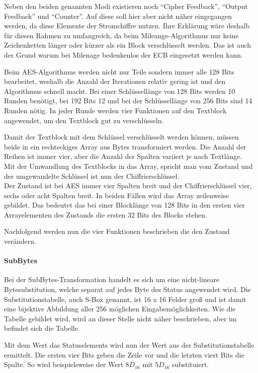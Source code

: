   Neben den beiden genannten Modi existieren noch ``Cipher Feedback'', ``Output Feedback'' und
  ``Counter''. Auf diese soll hier aber nicht näher eingegangen werden, da diese Elemente der
  Stromchiffre nutzen. Ihre Erklärung wäre deshalb für diesen Rahmen zu umfangreich, da beim
  Mileange-Algorithmus nur keine Zeichenketten länger oder kürzer als ein Block verschlüsselt
  werden. Das ist auch der Grund warum bei Milenage bedenkenlos der ECB eingesetzt werden kann.
  
  Beim AES-Algorithmus werden nicht nur Teile sondern immer alle 128 Bits bearbeitet, weshalb die
  Anzahl der Iterationen relativ gering ist und den Algorithmus schnell macht. Bei einer Schlüssellänge
  von 128 Bits werden 10 Runden benötigt, bei 192 Bits 12 und bei der Schlüssellänge von 256 Bits
  sind 14 Runden nötig. In jeder Runde werden vier Funktionen auf den Textblock angewendet, um
  den Textblock gut zu verschlüsseln.
  
  Damit der Textblock mit dem Schlüssel verschlüsselt werden können, müssen beide in ein rechteckiges
  Array aus Bytes transformiert werden. Die Anzahl der Reihen ist immer vier, aber die Anzahl der Spalten
  variiert je nach Textlänge. Mit der Umwandlung des Textblocks in das Array, spricht man vom Zustand
  und der umgewandelte Schlüssel ist nun der Chiffrierschlüssel. \\
  Der Zustand ist bei AES immer vier Spalten breit und der Chiffrierschlüssel vier, sechs oder acht Spalten
  breit. In beiden Fällen wird das Array zeilenweise gebildet. Das bedeutet das bei einer Blocklänge von
  128 Bits in den ersten vier Arrayelementen des Zustands die ersten 32 Bits des Blocks stehen.
  
  Nachfolgend werden nun die vier Funktionen beschrieben die den Zustand verändern.
  
  \paragraph{SubBytes}
   Bei der SubBytes-Transformation handelt es sich um eine nicht-lineare Bytesubstitution, welche
   separat auf jedes Byte des Status angewendet wird. Die Substitutionstabelle, auch S-Box genannt,
   ist 16 x 16 Felder groß und ist damit eine bijektive Abbildung aller 256 möglichen Eingabemöglichkeiten.
   Wie die Tabelle gebildet wird, wird an dieser Stelle nicht näher beschrieben, aber im 
   befindet sich die Tabelle.
   
   Mit dem Wert das Statuselements wird nun der Wert aus der Substitutionstabelle ermittelt. Die ersten vier
   Bits geben die Zeile vor und die letzten viert Bits die Spalte. So wird beispielsweise der Wert $8D_{16}$ mit
   $5D_{16}$ substituiert.
   
